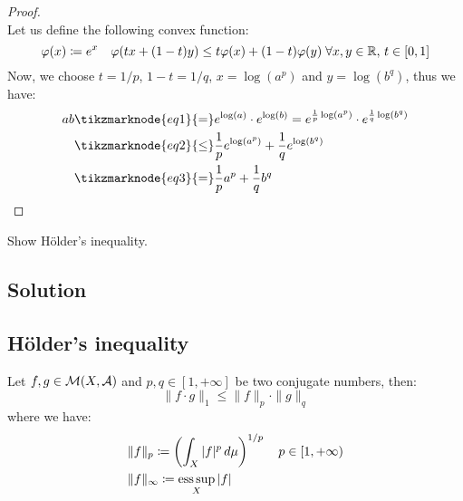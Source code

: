 \begin{proof}
    \hspace*{\fill}\\ %
    Let us define the following convex function:
    \[ \varphi(x) \coloneqq e^x \quad \varphi(tx + (1-t)y) \leq t\varphi(x) + (1-t)\varphi(y) \; \forall x,y \in \mathbb{R}, \, t \in [0,1] \]
    Now, we choose $t=1/p$, $1-t=1/q$, $x=\log(a^p)$ and $y=\log(b^q)$, thus we have:
    \begin{align*}
        ab & \tikzmarknode{eq1}{=} e^{\log(a)} \cdot e^{\log(b)} =  e^{\frac{1}{p}\log(a^p)} \cdot e^{\frac{1}{q}\log(b^q)} \\
        & \tikzmarknode{eq2}{\leq}  \frac{1}{p}e^{\log(a^p)} + \frac{1}{q}e^{\log(b^q)} \\
        & \tikzmarknode{eq3}{=} \frac{1}{p} a^p + \frac{1}{q} b^q
    \end{align*}

\end{proof}


\question
Show Hölder's inequality.

\subsection*{Solution}

\subsection{Hölder's inequality}
Let $f,g \in \mathcal{M}(X,\mathcal{A})$ and $p,q \in [1,+\infty]$ be two conjugate numbers, then:
\[ \| f \cdot g \|_1 \leq \| f \|_p \cdot \| g \|_q \]
where we have:
\begin{align*}
    & \|f\|_p \coloneqq \left( \int_X |f|^p \, d\mu \right)^{1/p} \quad p \in [1,+\infty) \\
    & \|f\|_\infty \coloneqq \operatorname*{ess\,sup}_X |f|
\end{align*}

